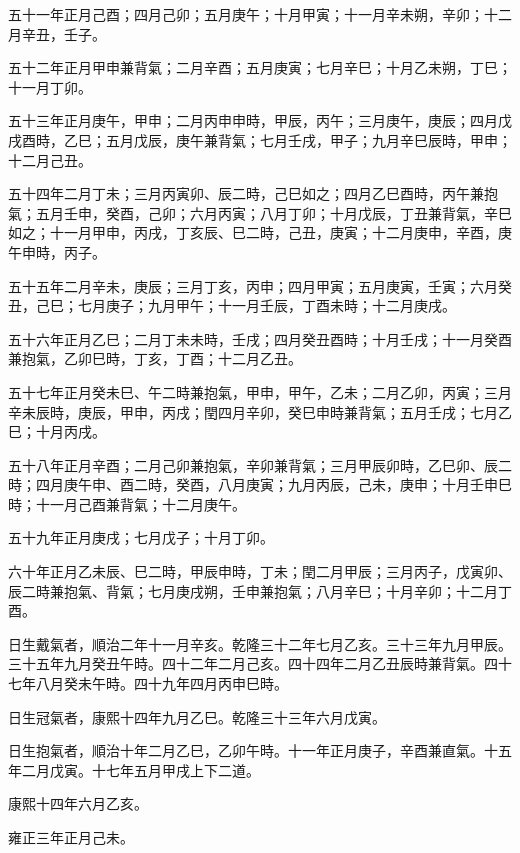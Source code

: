 \begin{pinyinscope}
五十一年正月己酉；四月己卯；五月庚午；十月甲寅；十一月辛未朔，辛卯；十二月辛丑，壬子。

五十二年正月甲申兼背氣；二月辛酉；五月庚寅；七月辛巳；十月乙未朔，丁巳；十一月丁卯。

五十三年正月庚午，甲申；二月丙申申時，甲辰，丙午；三月庚午，庚辰；四月戊戌酉時，乙巳；五月戊辰，庚午兼背氣；七月壬戌，甲子；九月辛巳辰時，甲申；十二月己丑。

五十四年二月丁未；三月丙寅卯、辰二時，己巳如之；四月乙巳酉時，丙午兼抱氣；五月壬申，癸酉，己卯；六月丙寅；八月丁卯；十月戊辰，丁丑兼背氣，辛巳如之；十一月甲申，丙戌，丁亥辰、巳二時，己丑，庚寅；十二月庚申，辛酉，庚午申時，丙子。

五十五年二月辛未，庚辰；三月丁亥，丙申；四月甲寅；五月庚寅，壬寅；六月癸丑，己巳；七月庚子；九月甲午；十一月壬辰，丁酉未時；十二月庚戌。

五十六年正月乙巳；二月丁未未時，壬戌；四月癸丑酉時；十月壬戌；十一月癸酉兼抱氣，乙卯巳時，丁亥，丁酉；十二月乙丑。

五十七年正月癸未巳、午二時兼抱氣，甲申，甲午，乙未；二月乙卯，丙寅；三月辛未辰時，庚辰，甲申，丙戌；閏四月辛卯，癸巳申時兼背氣；五月壬戌；七月乙巳；十月丙戌。

五十八年正月辛酉；二月己卯兼抱氣，辛卯兼背氣；三月甲辰卯時，乙巳卯、辰二時；四月庚午申、酉二時，癸酉，八月庚寅；九月丙辰，己未，庚申；十月壬申巳時；十一月己酉兼背氣；十二月庚午。

五十九年正月庚戌；七月戊子；十月丁卯。

六十年正月乙未辰、巳二時，甲辰申時，丁未；閏二月甲辰；三月丙子，戊寅卯、辰二時兼抱氣、背氣；七月庚戌朔，壬申兼抱氣；八月辛巳；十月辛卯；十二月丁酉。

日生戴氣者，順治二年十一月辛亥。乾隆三十二年七月乙亥。三十三年九月甲辰。三十五年九月癸丑午時。四十二年二月己亥。四十四年二月乙丑辰時兼背氣。四十七年八月癸未午時。四十九年四月丙申巳時。

日生冠氣者，康熙十四年九月乙巳。乾隆三十三年六月戊寅。

日生抱氣者，順治十年二月乙巳，乙卯午時。十一年正月庚子，辛酉兼直氣。十五年二月戊寅。十七年五月甲戌上下二道。

康熙十四年六月乙亥。

雍正三年正月己未。


\end{pinyinscope}
